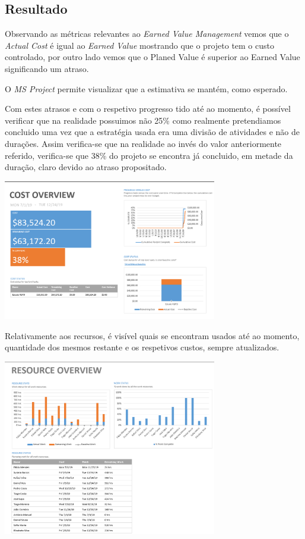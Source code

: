 \subsection{Resultado}
Observando as métricas relevantes ao \textit{Earned Value Management} vemos que o \textit{Actual Cost} é igual ao \textit{Earned Value} mostrando que o projeto tem o custo controlado, por outro lado vemos que o Planed Value é superior ao Earned Value significando um atraso.

O \textit{MS Project} permite visualizar que a estimativa se mantém, como esperado.

Com estes atrasos e com o respetivo progresso tido até ao momento, é possível verificar que na realidade possuimos não 25\% como realmente pretendiamos concluido uma vez que a estratégia usada era uma divisão de atividades e não de durações. Assim verifica-se que na realidade ao invés do valor anteriormente referido, verifica-se que 38\% do projeto se encontra já concluido, em metade da duração, claro devido ao atraso propositado.

\begin{center}
    \includegraphics[width=0.7\textwidth]{media/baseline2CostOverview.PNG}
\end{center}

Relativamente aos recursos, é visível quais se encontram usados até ao momento, quantidade dos mesmos restante e os respetivos custos, sempre atualizados.

\begin{center}
    \includegraphics[width=0.7\textwidth]{media/baseline2ResourceOverview.PNG}
\end{center}

